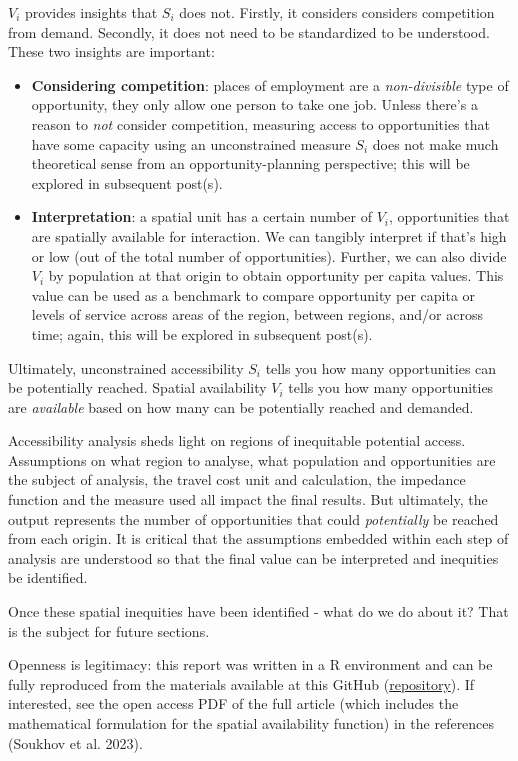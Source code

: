 \documentclass[12pt, oneside]{report}
\providecommand{\tightlist}{%
  \setlength{\itemsep}{0pt}\setlength{\parskip}{0pt}}\usepackage{longtable,booktabs,array}
\begin{document}
\(V_i\) provides insights that \(S_i\) does not. Firstly, it considers
considers competition from demand. Secondly, it does not need to be
standardized to be understood. These two insights are important:

\begin{itemize}
\tightlist
\item
  \textbf{Considering competition}: places of employment are a
  \emph{non-divisible} type of opportunity, they only allow one person
  to take one job. Unless there's a reason to \emph{not} consider
  competition, measuring access to opportunities that have some capacity
  using an unconstrained measure \(S_i\) does not make much theoretical
  sense from an opportunity-planning perspective; this will be explored
  in subsequent post(s).
\item
  \textbf{Interpretation}: a spatial unit has a certain number of
  \(V_i\), opportunities that are spatially available for interaction.
  We can tangibly interpret if that's high or low (out of the total
  number of opportunities). Further, we can also divide \(V_i\) by
  population at that origin to obtain opportunity per capita values.
  This value can be used as a benchmark to compare opportunity per
  capita or levels of service across areas of the region, between
  regions, and/or across time; again, this will be explored in
  subsequent post(s).
\end{itemize}

Ultimately, unconstrained accessibility \(S_i\) tells you how many
opportunities can be potentially reached. Spatial availability \(V_i\)
tells you how many opportunities are \emph{available} based on how many
can be potentially reached and demanded.

Accessibility analysis sheds light on regions of inequitable potential
access. Assumptions on what region to analyse, what population and
opportunities are the subject of analysis, the travel cost unit and
calculation, the impedance function and the measure used all impact the
final results. But ultimately, the output represents the number of
opportunities that could \emph{potentially} be reached from each origin.
It is critical that the assumptions embedded within each step of
analysis are understood so that the final value can be interpreted and
inequities be identified.

Once these spatial inequities have been identified - what do we do about
it? That is the subject for future sections.

Openness is legitimacy: this report was written in a R environment and
can be fully reproduced from the materials available at this GitHub
(\href{https://github.com/soukhova/MJ-Accessibility-Blogs}{repository}).
If interested, see the open access PDF of the full article (which
includes the mathematical formulation for the spatial availability
function) in the references (Soukhov et al. 2023).
\end{document}
